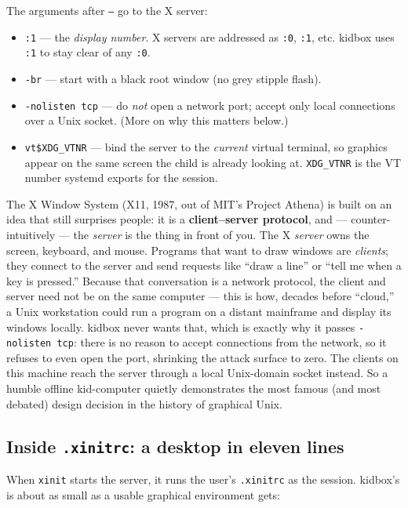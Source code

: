 \documentclass[11pt,oneside]{article}
\newcommand{\code}[1]{\texorpdfstring{\textcolor{kbblue}{\texttt{#1}}}{#1}}
\newcommand{\file}[1]{\textcolor{kbteal}{\texttt{#1}}}
\begin{document}
The arguments after \code{--} go to the X server:
\begin{itemize}
\item \code{:1} --- the \emph{display number}. X servers are addressed as
\code{:0}, \code{:1}, etc. kidbox uses \code{:1} to stay clear of any \code{:0}.
\item \code{-br} --- start with a black root window (no grey stipple flash).
\item \code{-nolisten tcp} --- do \emph{not} open a network port; accept only
local connections over a Unix socket. (More on why this matters below.)
\item \code{vt\$XDG\_VTNR} --- bind the server to the \emph{current} virtual
terminal, so graphics appear on the same screen the child is already looking at.
\code{XDG\_VTNR} is the VT number systemd exports for the session.
\end{itemize}

\begin{deeper}
The X Window System (X11, 1987, out of MIT's Project Athena) is built on an idea
that still surprises people: it is a \textbf{client--server protocol}, and ---
counter-intuitively --- the \emph{server} is the thing in front of you. The X
\emph{server} owns the screen, keyboard, and mouse. Programs that want to draw
windows are \emph{clients}; they connect to the server and send requests like
``draw a line'' or ``tell me when a key is pressed.'' Because that conversation
is a network protocol, the client and server need not be on the same computer
--- this is how, decades before ``cloud,'' a Unix workstation could run a program
on a distant mainframe and display its windows locally. kidbox never wants that,
which is exactly why it passes \code{-nolisten tcp}: there is no reason to accept
connections from the network, so it refuses to even open the port, shrinking the
attack surface to zero. The clients on this machine reach the server through a
local Unix-domain socket instead. So a humble offline kid-computer quietly
demonstrates the most famous (and most debated) design decision in the history
of graphical Unix.
\end{deeper}

\subsection{Inside \file{.xinitrc}: a desktop in eleven lines}

When \texttt{xinit} starts the server, it runs the user's \file{.xinitrc} as the
session. kidbox's is about as small as a usable graphical environment gets:
\end{document}
